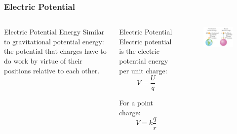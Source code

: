 \documentclass{beamer}
\begin{document}
\begin{frame}
    \frametitle{Electric Potential}
    \begin{columns}
        \begin{block}{Electric Potential Energy}
            Similar to gravitational potential energy: the potential that charges have to do work by virtue of their positions relative to each other.
        \end{block}
        
        \begin{block}{Electric Potential}
            Electric potential is the electric potential energy per unit charge:
            \begin{equation}
                V = \frac{U}{q}
            \end{equation}
            
            For a point charge:
            \begin{equation}
                V = k\frac{q}{r}
            \end{equation}
        \end{block}
        
        \begin{alertblock}{ }
            \begin{figure}
                \centering
                \includegraphics[width=1\linewidth]{ptnla.png}
            \end{figure}
        \end{alertblock}
    \end{columns}
\end{frame}
\end{document}
